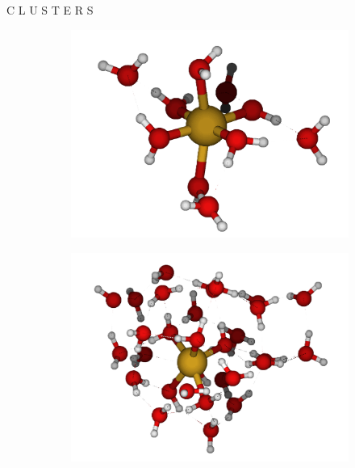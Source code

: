 \documentclass[final]{beamer}
\newlength{\colwidth}
\begin{document}
\begin{frame}[t]
\begin{columns}[t]
\begin{column}{\colwidth}
\begin{alertblock}{C L U S T E R S}
\begin{figure}[H]
					\begin{subfigure}[b]{0.27\textwidth}
						\centering
						\includegraphics[width=\textwidth]{logos/Cu-10H2O.png}
						\caption{}
						\label{fig:cu-10h2o}
					\end{subfigure}%
					\hfill
					\begin{subfigure}[b]{0.27\textwidth}
						\centering
						\includegraphics[width=\textwidth]{logos/Cu-30H2O.png}
						\caption{}
						\label{fig:cu-30h2o}
					\end{subfigure}%
					\hfill
					\begin{subfigure}[b]{0.27\textwidth}
						\centering

\end{subfigure}
\end{figure}
\end{alertblock}
\end{column}
\end{columns}
\end{frame}
\end{document}
